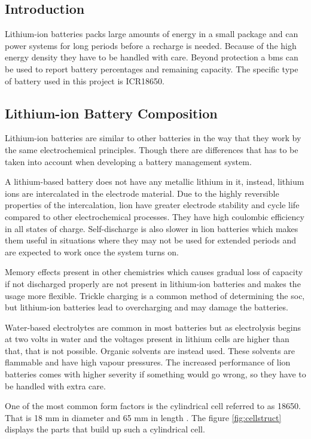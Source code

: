 \subsection{Introduction}
Lithium-ion batteries packs large amounts of energy in a small package and can power systems for long periods before a recharge is needed. Because of the high energy density they have to be handled with care. Beyond protection a \gls{bms} can be used to report battery percentages and remaining capacity. The specific type of battery used in this project is ICR18650.

\subsection{Lithium-ion Battery Composition}
Lithium-ion batteries are similar to other batteries in the way that they work by the same electrochemical principles. Though there are differences that has to be taken into account when developing a battery management system.

A lithium-based battery does not have any metallic lithium in it, instead, lithium ions are intercalated in the electrode material. Due to the highly reversible properties of the intercalation, \gls{lion} have greater electrode stability and cycle life compared to other electrochemical processes. They have high coulombic efficiency in all states of charge. Self-discharge is also slower in \gls{lion} batteries which makes them useful in situations where they may not be used for extended periods and are expected to work once the system turns on.

Memory effects present in other chemistries which causes gradual loss of capacity if not discharged properly are not present in lithium-ion batteries and makes the usage more flexible. Trickle charging is a common method of determining the \gls{soc}, but lithium-ion batteries lead to overcharging and may damage the batteries.

Water-based electrolytes are common in most batteries but as electrolysis begins at two volts in water and the voltages present in lithium cells are higher than that, that is not possible. Organic solvents are instead used. These solvents are flammable and have high vapour pressures. The increased performance of \gls{lion} batteries comes with higher severity if something would go wrong, so they have to be handled with extra care.

One of the most common form factors is the cylindrical cell referred to as 18650. That is 18 mm in diameter and 65 mm in length \cite{book26}. The figure \autoref{fig:cellstruct} displays the parts that build up such a cylindrical cell.

